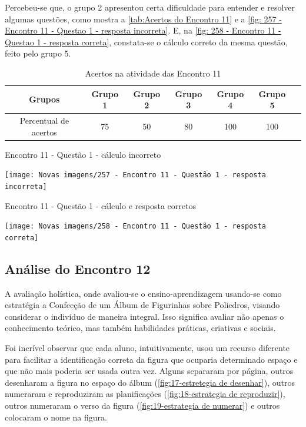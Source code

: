 Percebeu-se que, o grupo 2 apresentou certa dificuldade para entender e resolver algumas questões, como mostra a \autoref{tab:Acertos do Encontro 11} e a \autoref{fig: 257 - Encontro 11 - Questao 1 - resposta incorreta}. E, na \autoref{fig: 258 - Encontro 11 - Questao 1 - resposta correta}, constata-se o cálculo correto da mesma questão, feito pelo grupo 5.

\begin{table}[htbp] \centering
    \caption{Acertos na atividade das Encontro 11} \label{tab:Acertos do Encontro 11}
    \begin{tabular}{|c|c|c|c|c|c|c|}
        \hline
        \textbf{Grupos}       & \textbf{Grupo 1} & \textbf{Grupo 2} & \textbf{Grupo 3} & \textbf{Grupo 4} & \textbf{Grupo 5} \\
        \hline
        Percentual de acertos & 75               & 50               & 80               & 100              & 100              \\
        \hline
    \end{tabular}
    \legend{\legendaTabela}
\end{table}

\begin{CenteredFigure}
    \caption{Encontro 11 - Questão 1 - cálculo incorreto} \label{fig: 257 - Encontro 11 - Questao 1 - resposta incorreta}
    \texttt{[image: Novas imagens/257 - Encontro 11 - Questão 1 - resposta incorreta]}
    \legend{\autoria}
\end{CenteredFigure}

\begin{CenteredFigure}
    \caption{Encontro 11 - Questão 1 - cálculo e resposta corretos} \label{fig: 258 - Encontro 11 - Questao 1 - resposta correta}
    \texttt{[image: Novas imagens/258 - Encontro 11 - Questão 1 - resposta correta]}
    \legend{\autoria}
\end{CenteredFigure}

\subsection{Análise do Encontro 12}

A avaliação holística, onde avaliou-se o ensino-aprendizagem usando-se como estratégia a Confecção de um Álbum de Figurinhas sobre Poliedros, visando considerar o indivíduo de maneira integral. Isso significa avaliar não apenas o conhecimento teórico, mas também habilidades práticas, criativas e sociais.

Foi incrível observar que cada aluno, intuitivamente, usou um recurso diferente para facilitar a identificação correta da figura que ocuparia determinado espaço e que não mais poderia ser usada outra vez. Alguns separaram por página, outros desenharam a figura no espaço do álbum (\autoref{fig:17-estretegia de desenhar}), outros numeraram e reproduziram as planificações (\autoref{fig:18-estrategia de reproduzir}), outros numeraram o verso da figura (\autoref{fig:19-estrategia de numerar}) e outros colocaram o nome na figura.

